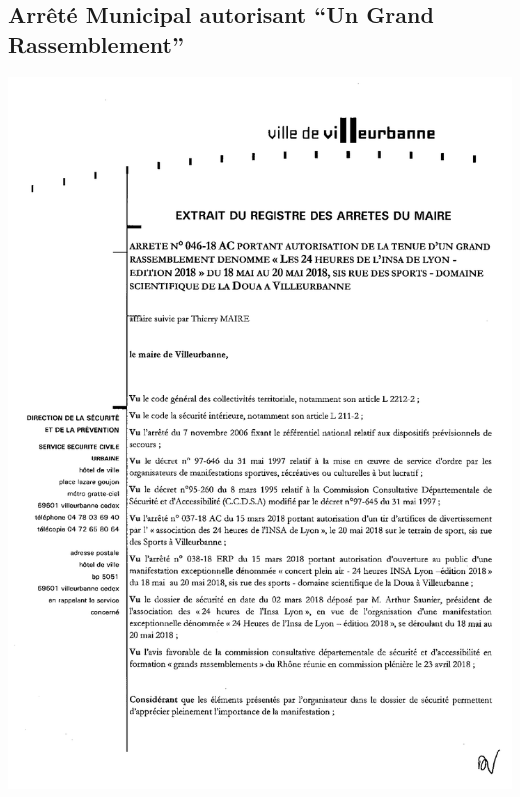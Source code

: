 \documentclass[hidelinks, paper=a4, fontsize=13pt]{report}
\begin{document}
\subsection{Arrêté Municipal autorisant “Un Grand Rassemblement”}
\begin{center}
\includegraphics[scale=0.70]{Annexes/Documents/VilleurbanneGrandRassemblement1}

\end{center}
\end{document}
